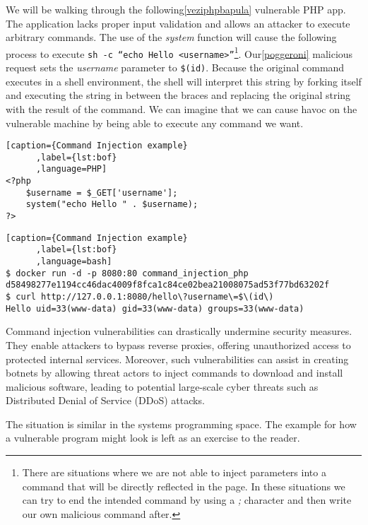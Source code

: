 \documentclass{article}
\begin{document}
We will be walking through the following\ref{veziphpbapula} vulnerable PHP app.
The application lacks proper input validation and allows an attacker to execute
arbitrary commands. The use of the \emph{system} function will cause the
following process to execute \texttt{sh -c ``echo Hello
<username>''}\footnote{There are situations where we are not able to inject
parameters into a command that will be directly reflected in the page. In these
situations we can try to end the intended command by using a \emph{;} character
and then write our own malicious command after.}. Our\ref{poggeroni} malicious
request sets the \emph{username} parameter to \verb|$(id)|. Because
the original command executes in a shell environment, the shell will interpret
this string by forking itself and executing the string in between the braces and
replacing the original string with the result of the command. We can imagine that
we can cause havoc on the vulnerable machine by being able to execute any command
we want.

\begin{minipage}{\linewidth}
\begin{lstlisting}[caption={Command Injection example}
      ,label={lst:bof}
      ,language=PHP]
<?php
    $username = $_GET['username'];
    system("echo Hello " . $username);
?>
\end{lstlisting}
\end{minipage}

\begin{lstlisting}[caption={Command Injection example}
      ,label={lst:bof}
      ,language=bash]
$ docker run -d -p 8080:80 command_injection_php
d58498277e1194cc46dac4009f8fca1c84ce02bea21008075ad53f77bd63202f
$ curl http://127.0.0.1:8080/hello\?username\=$\(id\)
Hello uid=33(www-data) gid=33(www-data) groups=33(www-data)
\end{lstlisting}
Command injection vulnerabilities can drastically undermine security measures.
They enable attackers to bypass reverse proxies, offering unauthorized access to
protected internal services. Moreover, such vulnerabilities can assist in
creating botnets by allowing threat actors to inject commands to download and
install malicious software, leading to potential large-scale cyber threats such
as Distributed Denial of Service (DDoS) attacks.

The situation is similar in the systems programming space. The example for how a vulnerable program might look is left as an exercise to the reader.
\end{document}
